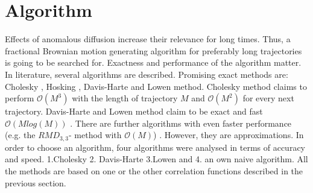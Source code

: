 \documentclass[
  a4paper,BCOR10mm,twoside,
  headsepline,footsepline,%
  fleqn,openbib
]{scrbook}
\begin{document}
\section{Algorithm}
Effects of anomalous diffusion increase their relevance for long times. Thus, a fractional Brownian motion generating algorithm for preferably long trajectories is going to be searched for. Exactness and performance of the algorithm matter. In literature, several algorithms are described. Promising exact methods are: Cholesky \cite{Dieker2004}, Hosking \cite{WRCR:WRCR3676}, Davis-Harte \cite{Dieker2004} and  Lowen \cite{Lowen1999} method. Cholesky  method claims to perform $\mathcal{O}(M^3)$ with the length of trajectory $M$ and $\mathcal{O}(M^2)$ for every next trajectory. Davis-Harte and Lowen method claim to be exact and fast $\mathcal{O}(M log(M))$ \cite{DAVIES1987}\cite{Lowen1999}. There are further algorithms with even faster performance (e.g. the $RMD_{3,3}$- method \cite{Dieker2004} with $\mathcal{O}(M)$) . However, they are approximations. In order to choose an algorithm, four algorithms were analysed in terms of accuracy and speed. 1.Cholesky  2. Davis-Harte 3.Lowen and 4. an own naive algorithm. All the methods are based on one or the other correlation functions described in the previous section.  
\end{document}
